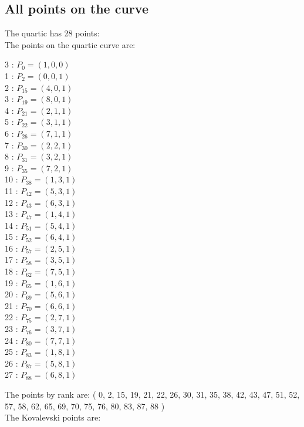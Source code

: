 \documentclass{article}
\begin{document}
{\subsection*{All points on the curve}
The quartic has 28 points:\\
The points on the quartic curve are:\\
\begin{multicols}{3}
 : $P_{0}=( 1, 0, 0 )$\\
1 : $P_{2}=( 0, 0, 1 )$\\
2 : $P_{15}=( 4, 0, 1 )$\\
3 : $P_{19}=( 8, 0, 1 )$\\
4 : $P_{21}=( 2, 1, 1 )$\\
5 : $P_{22}=( 3, 1, 1 )$\\
6 : $P_{26}=( 7, 1, 1 )$\\
7 : $P_{30}=( 2, 2, 1 )$\\
8 : $P_{31}=( 3, 2, 1 )$\\
9 : $P_{35}=( 7, 2, 1 )$\\
10 : $P_{38}=( 1, 3, 1 )$\\
11 : $P_{42}=( 5, 3, 1 )$\\
12 : $P_{43}=( 6, 3, 1 )$\\
13 : $P_{47}=( 1, 4, 1 )$\\
14 : $P_{51}=( 5, 4, 1 )$\\
15 : $P_{52}=( 6, 4, 1 )$\\
16 : $P_{57}=( 2, 5, 1 )$\\
17 : $P_{58}=( 3, 5, 1 )$\\
18 : $P_{62}=( 7, 5, 1 )$\\
19 : $P_{65}=( 1, 6, 1 )$\\
20 : $P_{69}=( 5, 6, 1 )$\\
21 : $P_{70}=( 6, 6, 1 )$\\
22 : $P_{75}=( 2, 7, 1 )$\\
23 : $P_{76}=( 3, 7, 1 )$\\
24 : $P_{80}=( 7, 7, 1 )$\\
25 : $P_{83}=( 1, 8, 1 )$\\
26 : $P_{87}=( 5, 8, 1 )$\\
27 : $P_{88}=( 6, 8, 1 )$\\
\end{multicols}
The points by rank are: 
( 0, 2, 15, 19, 21, 22, 26, 30, 31, 35, 38, 42, 43, 47, 51, 52, 57, 58, 62, 65, 69, 70, 75, 76, 80, 83, 87, 88 )\\
The Kovalevski points are: \\
}
\end{document}
